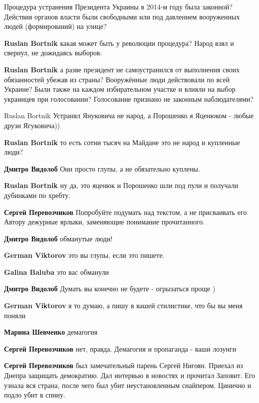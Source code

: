 \begin{itemize}
\begin{itemize}
Процедура устранения Президента Украины в 2014-м году была законной? Действия
органов власти были свободными или под давлением вооруженных людей
(формирований) на улице?


\textbf{Ruslan Bortnik} какая может быть у революции процедура? Народ взял и свернул, не дожидаясь выборов.

\textbf{Ruslan Bortnik} а разве президент не самоустранился от выполнения своих обязанностей убежав из страны?
Вооружённые люди действовали по всей Украине? Были также на каждом избирательном участке и влияли на выбор украинцев при голосовании? Голосование признано не законным наблюдателями?

Ruslan Bortnik
Устранял Януковича не народ, а Порошенко я Яценюком - любые друзи Ягуковича))

\textbf{Ruslan Bortnik} то есть сотни тысяч на Майдане это не народ и купленные люди?

\textbf{Дмитро Видолоб} Они просто глупы, а не обязательно куплены.

\textbf{Ruslan Bortnik} ну да, это яценюк и Порошенко шли под пули и получали дубинками по хребту.

\textbf{Сергей Перевозчиков} Попробуйте подумать над текстом, а не присваивать его Автору дежурные ярлыки, заменяющие понимание прочитанного.

\textbf{Дмитро Видолоб} обманутые люди!

\textbf{German Viktorov} это вы глупы, если это пишете.

\textbf{Galina Baluba} это вас обманули

\textbf{Дмитро Видолоб} Думать вы конечно не будете - огрызаться проще )

\textbf{German Viktorov} я то думаю, а пишу в вашей стилистике, что бы вы меня поняли

\textbf{Марина Шевченко} демагогия

\textbf{Сергей Перевозчиков} нет, правда. Демагогия и пропаганда - ваши лозунги

\textbf{Сергей Перевозчиков} был замечательный парень Сергей Нигоян. Приехал из Днепра защищать демократию. Дал интервью в новостях и прочитал Заповит. Его узнала вся страна, после чего был убит неустановленным снайпером. Цинично и подло убит в спину.


\end{itemize}
\end{itemize}
